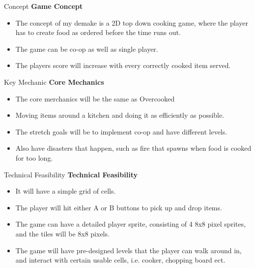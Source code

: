 \documentclass{beamer}
\begin{document}
\begin{frame}{Concept}		
	\textbf{Game Concept} \pause
		\begin{itemize}
			\item The concept of my demake is a 2D top down cooking game, where the player has to create food as ordered before the time runs out. \pause
			\item The game can be co-op as well as single player. \pause
			\item The players score will increase with every correctly cooked item served.
			
		\end{itemize}
\end{frame}

\begin{frame}{Key Mechanic}		
	\textbf{Core Mechanics} \pause
		\begin{itemize}
		    \item The core merchanics will be the same as Overcooked \pause
			\item Moving items around a kitchen and doing it as efficiently as possible.  \pause
			\item The stretch goals will be to implement co-op and have different levels. \pause
			\item Also have disasters that happen, such as fire that spawns when food is cooked for too long.
			

		\end{itemize}
\end{frame}

\begin{frame}{Technical Feasibility}		
	\textbf{Technical Feasibility} \pause
	
		\begin{itemize}
			\item It will have a simple grid of cells. \pause
			\item The player will hit either A or B buttons to pick up and drop items.  \pause
			\item The game can have a detailed player sprite, consisting of 4 8x8 pixel sprites, and the tiles will be 8x8 pixels.  \pause
			\item The game will have pre-designed levels that the player can walk around in, and interact with certain usable cells, i.e. cooker, chopping board ect.
			
		\end{itemize}
\end{frame}
\end{document}
